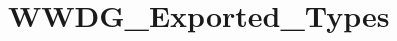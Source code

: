 \hypertarget{group___w_w_d_g___exported___types}{}\section{W\+W\+D\+G\+\_\+\+Exported\+\_\+\+Types}
\label{group___w_w_d_g___exported___types}
